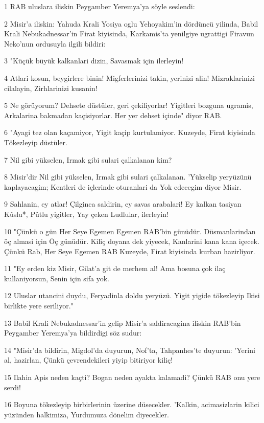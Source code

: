 \par 1 RAB uluslara iliskin Peygamber Yeremya'ya söyle seslendi:
\par 2 Misir'a iliskin: Yahuda Krali Yosiya oglu Yehoyakim'in dördüncü yilinda, Babil Krali Nebukadnessar'in Firat kiyisinda, Karkamis'ta yenilgiye ugrattigi Firavun Neko'nun ordusuyla ilgili bildiri:
\par 3 "Küçük büyük kalkanlari dizin, Savasmak için ilerleyin!
\par 4 Atlari kosun, beygirlere binin! Migferlerinizi takin, yerinizi alin! Mizraklarinizi cilalayin, Zirhlarinizi kusanin!
\par 5 Ne görüyorum? Dehsete düstüler, geri çekiliyorlar! Yigitleri bozguna ugramis, Arkalarina bakmadan kaçisiyorlar. Her yer dehset içinde" diyor RAB.
\par 6 "Ayagi tez olan kaçamiyor, Yigit kaçip kurtulamiyor. Kuzeyde, Firat kiyisinda Tökezleyip düstüler.
\par 7 Nil gibi yükselen, Irmak gibi sulari çalkalanan kim?
\par 8 Misir'dir Nil gibi yükselen, Irmak gibi sulari çalkalanan. 'Yükselip yeryüzünü kaplayacagim; Kentleri de içlerinde oturanlari da Yok edecegim diyor Misir.
\par 9 Sahlanin, ey atlar! Çilginca saldirin, ey savas arabalari! Ey kalkan tasiyan Kûslu*, Pûtlu yigitler, Yay çeken Ludlular, ilerleyin!
\par 10 "Çünkü o gün Her Seye Egemen Egemen RAB'bin günüdür. Düsmanlarindan öç almasi için Öç günüdür. Kiliç doyana dek yiyecek, Kanlarini kana kana içecek. Çünkü Rab, Her Seye Egemen RAB Kuzeyde, Firat kiyisinda kurban hazirliyor.
\par 11 "Ey erden kiz Misir, Gilat'a git de merhem al! Ama bosuna çok ilaç kullaniyorsun, Senin için sifa yok.
\par 12 Uluslar utancini duydu, Feryadinla doldu yeryüzü. Yigit yigide tökezleyip Ikisi birlikte yere seriliyor."
\par 13 Babil Krali Nebukadnessar'in gelip Misir'a saldiracagina iliskin RAB'bin Peygamber Yeremya'ya bildirdigi söz sudur:
\par 14 "Misir'da bildirin, Migdol'da duyurun, Nof'ta, Tahpanhes'te duyurun: 'Yerini al, hazirlan, Çünkü çevrendekileri yiyip bitiriyor kiliç!
\par 15 Ilahin Apis neden kaçti? Bogan neden ayakta kalamadi? Çünkü RAB onu yere serdi!
\par 16 Boyuna tökezleyip birbirlerinin üzerine düsecekler. 'Kalkin, acimasizlarin kilici yüzünden halkimiza, Yurdumuza dönelim diyecekler.
